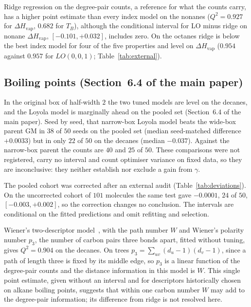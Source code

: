 \documentclass[a5paper, 10pt]{article}
\theoremstyle{plain}
\theoremstyle{remark}
\theoremstyle{definition}
\begin{document}
Ridge regression on the degree-pair counts, a reference for
what the counts carry, has a higher point estimate than every index model on the nonanes ($Q^2 = 0.927$ for $\Delta H_{\mathrm{vap}}$, $0.682$ for $T_B$), although the conditional interval for LO minus ridge on nonane $\Delta H_{\mathrm{vap}}$, $[-0.101, +0.032]$, includes zero. On the octanes ridge is below the best index model for four of the five properties and level on $\Delta H_{\mathrm{vap}}$ ($0.954$ against $0.957$ for $LO(0,0,1)$; Table~\ref{tab:external}).

\subsection{Boiling points (Section~6.4 of the main paper)}

In the original box of half-width $2$ the two tuned models are level on the decanes, and the Loyola
model is marginally ahead on the pooled set (Section~6.4 of the main paper). Seed by seed, that narrow-box Loyola model
beats the wide-box parent GM in $38$ of $50$ seeds on the pooled set
(median seed-matched difference $+0.0033$) but in only $22$ of $50$ on
the decanes (median $-0.037$). Against the narrow-box parent the counts
are $40$ and $25$ of $50$. These comparisons were not registered, carry
no interval and count optimiser variance on fixed data, so they are
inconclusive: they neither establish nor exclude a gain from $\gamma$.

The pooled cohort was corrected after an
external audit (Table~\ref{tab:deviations}). On the uncorrected cohort
of $101$ molecules the same test gave $-0.0001$, $24$ of $50$,
$[-0.003, +0.002]$, so the correction changes no conclusion. The
intervals are conditional on the fitted predictions and omit refitting
and selection.

Wiener's two-descriptor model~\cite{Wiener1947}, with the path number $W$ and Wiener's polarity number $p_3$, the number of carbon pairs three bonds apart, fitted without tuning, gives $Q^2 = 0.904$ on the decanes. On trees $p_3 = \sum_{uv}(d_u - 1)(d_v - 1)$, since a path of length three is fixed by its middle edge, so $p_3$ is a linear function of the degree-pair counts and the distance information in this model is $W$. This single point estimate, given without an interval and for descriptors historically chosen on alkane boiling points, suggests that within one carbon number $W$ may add to the degree-pair information; its difference from ridge is not resolved here.
\end{document}
